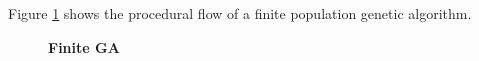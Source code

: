 Figure \ref{FiniteGA} shows the procedural flow of a finite population genetic algorithm.
\begin{figure}[H]
\begin{center}
\hspace{4pt}
\caption{\textbf{Finite GA} }
\label{FiniteGA}
\end{center}
\end{figure}

